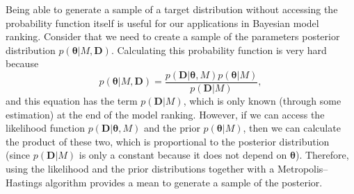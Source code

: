 Being able to generate a sample of a target distribution without 
accessing the probability function itself is useful for our applications
in Bayesian model ranking. Consider that we need to create a sample of
the parameters posterior distribution $p ({\bm \theta} | M, {\bm D})$. 
Calculating this probability function is very hard because
\begin{equation*}
  p({\bm \theta} | M, {\bm D}) 
    = \frac{p ({\bm D} | {\bm \theta}, M) p ({\bm \theta} | M)}
      {p ({\bm D}|M)},
\end{equation*}
and this equation has the term $p ({\bm D}|M)$, which is only known 
(through some estimation) at the end of the model ranking. However, if 
we can access the likelihood function $p ({\bm D}| {\bm \theta}, M)$ and 
the prior $p ({\bm \theta} | M)$, then we can calculate the product of 
these two, which is proportional to the posterior distribution (since 
$p ({\bm D}|M)$ is only a constant because it does not depend on 
${\bm \theta}$). Therefore, using the likelihood and the prior 
distributions together with a Metropolis--Hastings algorithm provides a 
mean to generate a sample of the posterior.

